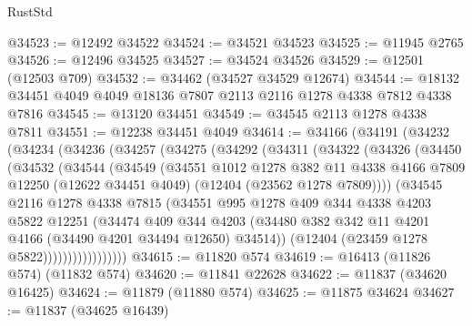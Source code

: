 \begin{lexlean}{RustStd}
\begin{coremodule}
{\begin{coremodule}
{{{{{{{{{{{{{{{{{{{{{{{{{{{{{{{{{{{{{{{{{{{{{{{{{{@34523 := @12492 @34522
@34524 := @34521 @34523
@34525 := @11945 @2765
@34526 := @12496 @34525
@34527 := @34524 @34526
@34529 := @12501 (@12503 @709)
@34532 := @34462 (@34527 @34529 @12674)
@34544 := @18132 @34451 @4049 @4049 @18136 @7807 @2113 @2116 @1278 @4338 @7812 @4338 @7816
@34545 := @13120 @34451
@34549 := @34545 @2113 @1278 @4338 @7811
@34551 := @12238 @34451 @4049
@34614 := @34166
    (@34191
      (@34232
        (@34234
          (@34236
            (@34257
              (@34275
                (@34292
                  (@34311
                    (@34322
                      (@34326
                        (@34450
                          (@34532
                            (@34544
                              (@34549
                                (@34551
                                  @1012
                                  @1278
                                  @382
                                  @11
                                  @4338
                                  @4166
                                  @7809
                                  @12250
                                  (@12622 @34451 @4049)
                                  (@12404 (@23562 @1278 @7809))))
                              (@34545
                                @2116
                                @1278
                                @4338
                                @7815
                                (@34551
                                  @995
                                  @1278
                                  @409
                                  @344
                                  @4338
                                  @4203
                                  @5822
                                  @12251
                                  (@34474
                                    @409
                                    @344
                                    @4203
                                    (@34480
                                      @382
                                      @342
                                      @11
                                      @4201
                                      @4166
                                      (@34490 @4201 @34494 @12650)
                                      @34514))
                                  (@12404 (@23459 @1278 @5822)))))))))))))))))
@34615 := @11820 @574
@34619 := @16413 (@11826 @574) (@11832 @574)
@34620 := @11841 @22628
@34622 := @11837 (@34620 @16425)
@34624 := @11879 (@11880 @574)
@34625 := @11875 @34624
@34627 := @11837 (@34625 @16439)
}}}}}}}}}}}}}}}}}}}}}}}}}}}}}}}}}}}}}}}}}}}}}}}}}}
\end{coremodule}}
\end{coremodule}
\end{lexlean}
